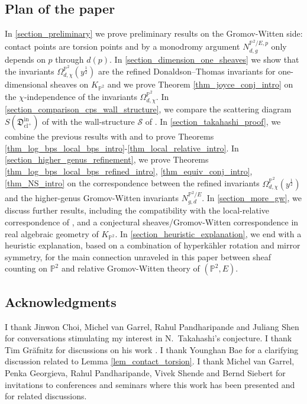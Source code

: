 \documentclass[11pt,letterpaper]{amsart}
\newcommand\PP{\mathbb P}
\newcommand\fD{\mathfrak D}
\newcommand\cl{\operatorname{cl}}
\newcommand\iin{\mathrm{in}}
\begin{document}
\subsection{Plan of the paper}
In \cref{section_preliminary} we prove preliminary results on the Gromov-Witten side: contact points are torsion points and by a monodromy argument $N_{d,g}^{\PP^2/E,p}$
only depends on $p$ through $d(p)$.
In \cref{section_dimension_one_sheaves}
we show that the invariants $\Omega_{d,\chi}^{\PP^2}(y^{\frac{1}{2}})$ are the
refined Donaldson--Thomas invariants for
one-dimensional sheaves on $K_{\PP^2}$ and 
we prove Theorem 
\ref{thm_joyce_conj_intro} on the 
$\chi$-independence of the invariants 
$\Omega_{d,\chi}^{\PP^2}$.
In \cref{section_comparison_cps_wall_structure}, we compare the scattering diagram $S(\fD^\iin_{\cl^+})$ of 
\cite{bousseau2019scattering} with the wall-structure 
$\mathcal{S}$ of \cite{cps}.
In \cref{section_takahashi_proof}, we combine the previous results with
\cite{bousseau2019scattering} and \cite{gabele2019tropical} to prove Theorems \ref{thm_log_bps_local_bps_intro}-\ref{thm_local_relative_intro}.
In \cref{section_higher_genus_refinement},
we prove Theorems 
\ref{thm_log_bps_local_bps_refined_intro},
\ref{thm_equiv_conj_intro}, \ref{thm_NS_intro}
on the correspondence between the refined 
invariants $\Omega_{d,\chi}^{\PP^2}(y^{\frac{1}{2}})$ and the higher-genus Gromov-Witten invariants $N_{g,d}^{\PP^2/E}$.
In \cref{section_more_gw}, we discuss further results, including the compatibility with the local-relative correspondence
of \cite{MR3948687}, and a conjectural sheaves/Gromov-Witten correspondence in real algebraic geometry of 
$K_{\PP^2}$.
In \cref{section_heuristic_explanation}, 
we end with a heuristic explanation, based on a combination of hyperkähler rotation
and mirror symmetry, for the main connection unraveled in this paper between sheaf counting on $\PP^2$ and relative Gromov-Witten theory of $(\PP^2,E)$.

\subsection{Acknowledgments}
I thank Jinwon Choi, Michel van Garrel, Rahul Pandharipande and Juliang Shen for conversations stimulating my interest in N.\ Takahashi's conjecture. I thank Tim Gr\"afnitz for discussions on his work \cite{gabele2019tropical}. 
I thank Younghan Bae for a clarifying discussion related to Lemma 
\ref{lem_contact_torsion}. I thank Michel van Garrel, Penka Georgieva, Rahul Pandharipande, Vivek Shende and Bernd Siebert for invitations to conferences and seminars where this work has been presented and for related discussions.
\end{document}
